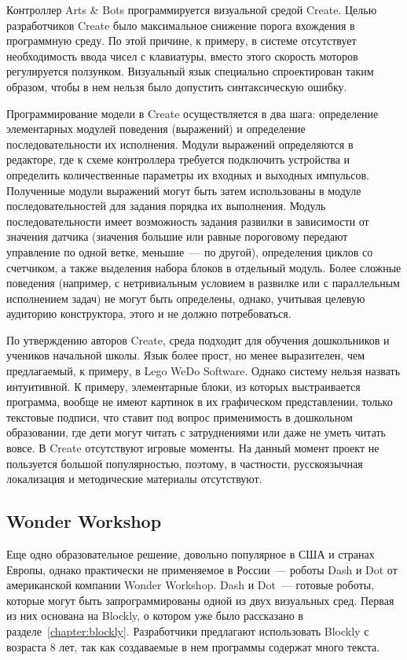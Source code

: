 \documentclass[a5paper]{article}
\begin{document}
Контроллер Arts \& Bots программируется визуальной средой Create. Целью разработчиков Create было максимальное 
снижение порога вхождения в программную среду. По этой причине, к примеру, в системе отсутствует необходимость 
ввода чисел с клавиатуры, вместо этого скорость моторов регулируется ползунком. Визуальный язык специально 
спроектирован таким образом, чтобы в нем нельзя было допустить синтаксическую ошибку.

Программирование модели в Create осуществляется в два шага: определение элементарных модулей поведения (выражений) 
и определение последовательности  их исполнения. Модули выражений определяются в редакторе, где к схеме контроллера 
требуется подключить устройства и определить количественные параметры их входных и выходных импульсов. Полученные 
модули выражений могут быть затем использованы в модуле последовательностей для задания порядка их выполнения. 
Модуль последовательности имеет возможность задания развилки в зависимости от значения датчика (значения большие 
или равные пороговому передают управление по одной ветке, меньшие~--- по другой), определения циклов со счетчиком, 
а также выделения набора блоков в отдельный модуль. Более сложные поведения (например, с нетривиальным условием в 
развилке или с параллельным исполнением задач) не могут быть определены, однако, учитывая целевую аудиторию 
конструктора, этого и не должно потребоваться.

По утверждению авторов Create, среда подходит для обучения дошкольников и учеников начальной школы. Язык более прост, 
но менее выразителен, чем предлагаемый, к примеру, в Lego WeDo Software. Однако систему нельзя назвать интуитивной. 
К примеру, элементарные блоки, из которых выстраивается программа, вообще не имеют картинок в их графическом 
представлении, только текстовые подписи, что ставит под вопрос применимость в дошкольном образовании, где дети могут 
читать с затруднениями или даже не уметь читать вовсе. В Create отсутствуют игровые моменты. На данный момент проект 
не пользуется большой популярностью, поэтому, в частности, русскоязычная локализация и методические материалы 
отсутствуют.

\subsection{Wonder Workshop}

Еще одно образовательное решение, довольно популярное в США и странах Европы, однако практически не применяемое в 
России~--- роботы Dash и Dot от американской компании Wonder Workshop. Dash и Dot~--- готовые роботы, которые 
могут быть запрограммированы одной из двух визуальных сред. Первая из них основана на Blockly, о котором уже 
было рассказано в разделе~\ref{chapter:blockly}. Разработчики предлагают использовать Blockly с возраста 8 лет, 
так как создаваемые в нем программы содержат много текста. 
\end{document}
